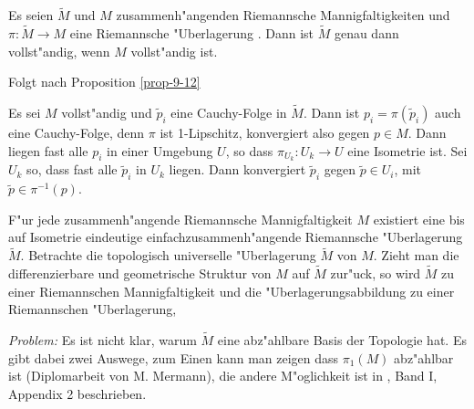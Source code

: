 \begin{Prop}
  Es seien $\tilde M$ und $M$ zusammenh"angenden Riemannsche Mannigfaltigkeiten und $\pi: \tilde M \to M$ eine Riemannsche "Uberlagerung . Dann ist $\tilde M$ genau dann vollst"andig, wenn $M$ vollst"andig ist.
\end{Prop}

\begin{bew}\begin{description}[font=\normalfont]
  \item[\quot{$\Rightarrow$}:]
    Folgt nach Proposition \ref{prop-9-12}
  \item[\quot{$\Leftarrow$}:]
    Es sei $M$ vollst"andig und $\tilde p_i$ eine Cauchy-Folge in $\tilde M$.
    Dann ist $p_i = \pi(\tilde p_i)$ auch eine Cauchy-Folge, denn $\pi$ ist 1-Lipschitz, konvergiert also gegen $p \in M$.
    Dann liegen fast alle $p_i$ in einer Umgebung $U$, so dass $\pi_{U_k}: U_k \to U$ eine Isometrie ist.
    Sei $U_k$ so, dass fast alle $\tilde p_i$ in $U_k$ liegen.
    Dann konvergiert $\tilde p_i$ gegen $\tilde p \in U_i$, mit $\tilde p \in \pi^{-1}(p)$.
  \end{description}\end{bew}

F"ur jede zusammenh"angende Riemannsche Mannigfaltigkeit $M$ existiert eine bis auf Isometrie eindeutige einfachzusammenh"angende Riemannsche "Uberlagerung $\tilde M$.
Betrachte die topologisch universelle "Uberlagerung $\tilde M$ von $M$.
Zieht man die differenzierbare und geometrische Struktur von $M$ auf $\tilde M$ zur"uck, so wird $\tilde M$ zu einer Riemannschen Mannigfaltigkeit und die "Uberlagerungsabbildung zu einer Riemannschen "Uberlagerung,

\emph{Problem:} Es ist nicht klar, warum $\tilde M$ eine abz"ahlbare Basis der Topologie hat.
Es gibt dabei zwei Auswege, zum Einen kann man zeigen dass $\pi_1(M)$ abz"ahlbar ist (Diplomarbeit von M. Mermann), die andere M"oglichkeit ist in , Band I, Appendix 2 \cite{kobayashi-nomizu1963foundations-diffgeo} beschrieben.

